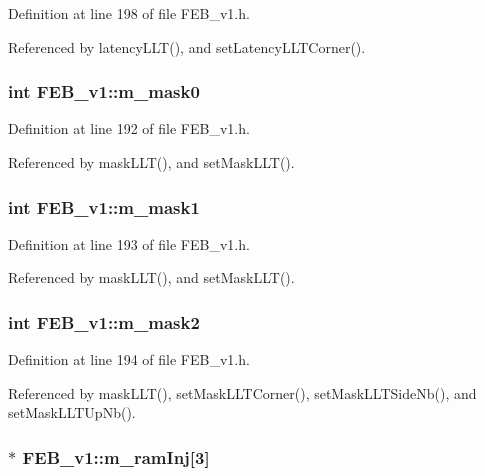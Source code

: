 Definition at line 198 of file FEB\_\-v1.h.

Referenced by latencyLLT(), and setLatencyLLTCorner().\hypertarget{classFEB__v1_ab49d6a271bdfddd9c7fac9435e4e686d}{
\subsubsection[{m\_\-mask0}]{\setlength{\rightskip}{0pt plus 5cm}int {\bf FEB\_\-v1::m\_\-mask0}}}
\label{classFEB__v1_ab49d6a271bdfddd9c7fac9435e4e686d}


Definition at line 192 of file FEB\_\-v1.h.

Referenced by maskLLT(), and setMaskLLT().\hypertarget{classFEB__v1_a1cbadb02155e2defdff6d6c8f70eb945}{
\subsubsection[{m\_\-mask1}]{\setlength{\rightskip}{0pt plus 5cm}int {\bf FEB\_\-v1::m\_\-mask1}}}
\label{classFEB__v1_a1cbadb02155e2defdff6d6c8f70eb945}


Definition at line 193 of file FEB\_\-v1.h.

Referenced by maskLLT(), and setMaskLLT().\hypertarget{classFEB__v1_a25f03f6de00618dd575fc1f77a9af9ee}{
\subsubsection[{m\_\-mask2}]{\setlength{\rightskip}{0pt plus 5cm}int {\bf FEB\_\-v1::m\_\-mask2}}}
\label{classFEB__v1_a25f03f6de00618dd575fc1f77a9af9ee}


Definition at line 194 of file FEB\_\-v1.h.

Referenced by maskLLT(), setMaskLLTCorner(), setMaskLLTSideNb(), and setMaskLLTUpNb().\hypertarget{classFEB__v1_a3a3d06225c94c88d4cc5da7a6bde3867}{
\subsubsection[{m\_\-ramInj}]{$\ast$ {\bf FEB\_\-v1::m\_\-ramInj}\mbox{[}3\mbox{]}}}
\label{classFEB__v1_a3a3d06225c94c88d4cc5da7a6bde3867}


